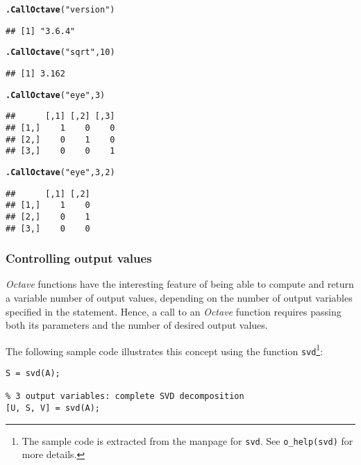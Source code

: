 \documentclass[english,10pt,a4paper]{article}\usepackage[]{graphicx}\usepackage[]{color}
\makeatletter
\newcommand{\hlnum}[1]{\textcolor[rgb]{0.686,0.059,0.569}{#1}}%
\newcommand{\hlstr}[1]{\textcolor[rgb]{0.192,0.494,0.8}{#1}}%
\newcommand{\hlstd}[1]{\textcolor[rgb]{0.345,0.345,0.345}{#1}}%
\newcommand{\hlkwd}[1]{\textcolor[rgb]{0.737,0.353,0.396}{\textbf{#1}}}%
\newenvironment{kframe}{%
 \def\at@end@of@kframe{}%
 \ifinner\ifhmode%
  \def\at@end@of@kframe{\end{minipage}}%
  \begin{minipage}{\columnwidth}%
 \fi\fi%
 \def\FrameCommand##1{\hskip\@totalleftmargin \hskip-\fboxsep
 \colorbox{shadecolor}{##1}\hskip-\fboxsep
     \hskip-\linewidth \hskip-\@totalleftmargin \hskip\columnwidth}%
 \MakeFramed {\advance\hsize-\width
   \@totalleftmargin\z@ \linewidth\hsize
   \@setminipage}}%
 {\par\unskip\endMakeFramed%
 \at@end@of@kframe}
\newenvironment{knitrout}{}{} %
\let\proglang=\textit
\let\code=\texttt
\newcommand{\octave}{\proglang{Octave}\xspace}
\makeatother
\begin{document}
\begin{knitrout}
\color{fgcolor}\begin{kframe}
\begin{alltt}
\hlkwd{.CallOctave}\hlstd{(}\hlstr{"version"}\hlstd{)}
\end{alltt}
\begin{verbatim}
## [1] "3.6.4"
\end{verbatim}
\begin{alltt}
\hlkwd{.CallOctave}\hlstd{(}\hlstr{"sqrt"}\hlstd{,} \hlnum{10}\hlstd{)}
\end{alltt}
\begin{verbatim}
## [1] 3.162
\end{verbatim}
\begin{alltt}
\hlkwd{.CallOctave}\hlstd{(}\hlstr{"eye"}\hlstd{,} \hlnum{3}\hlstd{)}
\end{alltt}
\begin{verbatim}
##      [,1] [,2] [,3]
## [1,]    1    0    0
## [2,]    0    1    0
## [3,]    0    0    1
\end{verbatim}
\begin{alltt}
\hlkwd{.CallOctave}\hlstd{(}\hlstr{"eye"}\hlstd{,} \hlnum{3}\hlstd{,} \hlnum{2}\hlstd{)}
\end{alltt}
\begin{verbatim}
##      [,1] [,2]
## [1,]    1    0
## [2,]    0    1
## [3,]    0    0
\end{verbatim}
\end{kframe}
\end{knitrout}


\subsubsection{Controlling output values}
\label{sec:argout}

\octave functions have the interesting feature of being able to compute
and return a variable number of output values, depending on the number of output
variables specified in the statement.
Hence, a call to an \octave function requires passing both its parameters and
the number of desired output values.

The following sample code illustrates this concept using the function
\code{svd}\footnote{The sample code is extracted from the manpage for
\code{svd}. See \code{o\_help(svd)} for more details.}:

\begin{Verbatim}[frame=single]
% single output variable: eigen values only
S = svd(A);

% 3 output variables: complete SVD decomposition  
[U, S, V] = svd(A);
\end{Verbatim}
\end{document}
